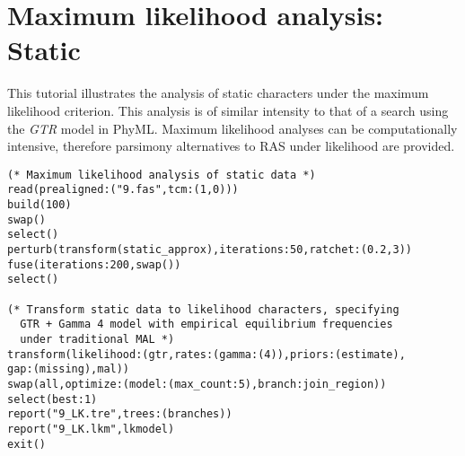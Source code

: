 \section{Maximum likelihood analysis: Static}{\label{tutorial11}}
This tutorial illustrates the analysis of static characters under the maximum likelihood criterion.  This analysis is of similar 
intensity to that of a search using the \emph{GTR} model in PhyML.  Maximum likelihood analyses can be 
computationally intensive, therefore parsimony alternatives to RAS under likelihood are provided.  

\begin{verbatim}
(* Maximum likelihood analysis of static data *)
read(prealigned:("9.fas",tcm:(1,0)))
build(100)
swap()
select()
perturb(transform(static_approx),iterations:50,ratchet:(0.2,3))
fuse(iterations:200,swap())
select()

(* Transform static data to likelihood characters, specifying 
  GTR + Gamma 4 model with empirical equilibrium frequencies   
  under traditional MAL *)
transform(likelihood:(gtr,rates:(gamma:(4)),priors:(estimate),
gap:(missing),mal))
swap(all,optimize:(model:(max_count:5),branch:join_region))
select(best:1)
report("9_LK.tre",trees:(branches))
report("9_LK.lkm",lkmodel)
exit()
\end{verbatim}

